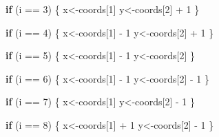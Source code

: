 \documentclass[]{tufte-book}
\newenvironment{Shaded}{}{}
\newcommand{\ControlFlowTok}[1]{\textcolor[rgb]{0.00,0.44,0.13}{\textbf{#1}}}
\newcommand{\DecValTok}[1]{\textcolor[rgb]{0.25,0.63,0.44}{#1}}
\newcommand{\NormalTok}[1]{#1}
\newcommand{\OtherTok}[1]{\textcolor[rgb]{0.00,0.44,0.13}{#1}}
\newcommand{\SpecialCharTok}[1]{\textcolor[rgb]{0.25,0.44,0.63}{#1}}
\begin{document}
\begin{Shaded}
\begin{Highlighting}[]
                \ControlFlowTok{if}\NormalTok{ (i }\SpecialCharTok{==} \DecValTok{3}\NormalTok{) \{}
\NormalTok{                        x}\OtherTok{\textless{}{-}}\NormalTok{coords[}\DecValTok{1}\NormalTok{]}
\NormalTok{                        y}\OtherTok{\textless{}{-}}\NormalTok{coords[}\DecValTok{2}\NormalTok{] }\SpecialCharTok{+} \DecValTok{1}
\NormalTok{                \}}
                
                \ControlFlowTok{if}\NormalTok{ (i }\SpecialCharTok{==} \DecValTok{4}\NormalTok{) \{}
\NormalTok{                        x}\OtherTok{\textless{}{-}}\NormalTok{coords[}\DecValTok{1}\NormalTok{] }\SpecialCharTok{{-}} \DecValTok{1}
\NormalTok{                        y}\OtherTok{\textless{}{-}}\NormalTok{coords[}\DecValTok{2}\NormalTok{] }\SpecialCharTok{+} \DecValTok{1}
\NormalTok{                \}}
                
                \ControlFlowTok{if}\NormalTok{ (i }\SpecialCharTok{==} \DecValTok{5}\NormalTok{) \{}
\NormalTok{                        x}\OtherTok{\textless{}{-}}\NormalTok{coords[}\DecValTok{1}\NormalTok{] }\SpecialCharTok{{-}} \DecValTok{1}
\NormalTok{                        y}\OtherTok{\textless{}{-}}\NormalTok{coords[}\DecValTok{2}\NormalTok{]}
\NormalTok{                \}}
                
                \ControlFlowTok{if}\NormalTok{ (i }\SpecialCharTok{==} \DecValTok{6}\NormalTok{) \{}
\NormalTok{                        x}\OtherTok{\textless{}{-}}\NormalTok{coords[}\DecValTok{1}\NormalTok{] }\SpecialCharTok{{-}} \DecValTok{1}
\NormalTok{                        y}\OtherTok{\textless{}{-}}\NormalTok{coords[}\DecValTok{2}\NormalTok{] }\SpecialCharTok{{-}} \DecValTok{1}
\NormalTok{                \}}
                
                \ControlFlowTok{if}\NormalTok{ (i }\SpecialCharTok{==} \DecValTok{7}\NormalTok{) \{}
\NormalTok{                        x}\OtherTok{\textless{}{-}}\NormalTok{coords[}\DecValTok{1}\NormalTok{]}
\NormalTok{                        y}\OtherTok{\textless{}{-}}\NormalTok{coords[}\DecValTok{2}\NormalTok{] }\SpecialCharTok{{-}} \DecValTok{1}
\NormalTok{                \}}
                
                \ControlFlowTok{if}\NormalTok{ (i }\SpecialCharTok{==} \DecValTok{8}\NormalTok{) \{}
\NormalTok{                        x}\OtherTok{\textless{}{-}}\NormalTok{coords[}\DecValTok{1}\NormalTok{] }\SpecialCharTok{+} \DecValTok{1}
\NormalTok{                        y}\OtherTok{\textless{}{-}}\NormalTok{coords[}\DecValTok{2}\NormalTok{] }\SpecialCharTok{{-}} \DecValTok{1}
\NormalTok{                \}}
                

\end{Highlighting}
\end{Shaded}
\end{document}
